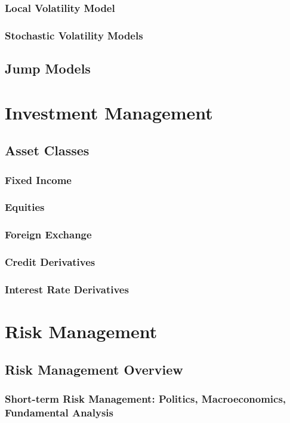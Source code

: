\documentclass{book}
\begin{document}
\subsection{Local Volatility Model}
\subsection{Stochastic Volatility Models}
\section{Jump Models}



\chapter{Investment Management}
\section{Asset Classes}
\subsection{Fixed Income}
\subsection{Equities}
\subsection{Foreign Exchange}
\subsection{Credit Derivatives}
\subsection{Interest Rate Derivatives}

\chapter{Risk Management}
\section{Risk Management Overview}
\subsection{Short-term Risk Management: Politics, Macroeconomics, Fundamental Analysis}
\end{document}
